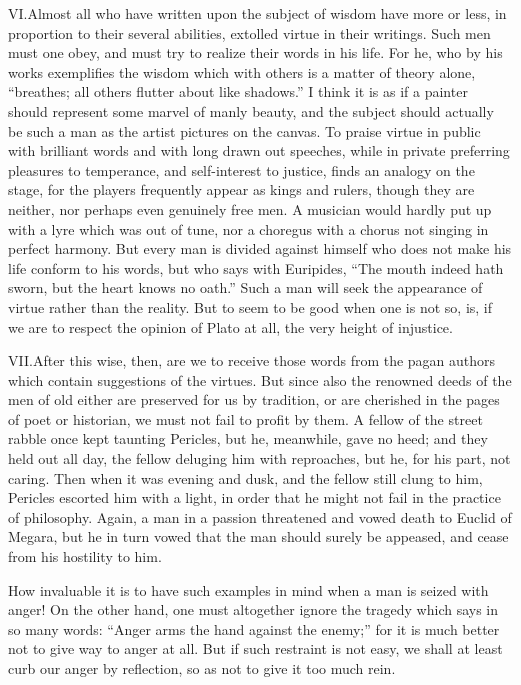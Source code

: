 \documentclass[a4paper]{article}
\begin{document}
\bigskip

\lettrine[lines=3, findent=3pt, nindent=0pt]{VI.} Almost all who have written upon the subject of wisdom have more or less, in proportion to their several abilities, extolled virtue in their writings. Such men must one obey, and must try to realize their words in his life. For he, who by his works exemplifies the wisdom which with others is a matter of theory alone, ``breathes; all others flutter about like shadows.'' I think it is as if a painter should represent some marvel of manly beauty, and the subject should actually be such a man as the artist pictures on the canvas. To praise virtue in public with brilliant words and with long drawn out speeches, while in private preferring pleasures to temperance, and self-interest to justice, finds an analogy on the stage, for the players frequently appear as kings and rulers, though they are neither, nor perhaps even genuinely free men. A musician would hardly put up with a lyre which was out of tune, nor a choregus with a chorus not singing in perfect harmony. But every man is divided against himself who does not make his life conform to his words, but who says with Euripides, ``The mouth indeed hath sworn, but the heart knows no oath.'' Such a man will seek the appearance of virtue rather than the reality. But to seem to be good when one is not so, is, if we are to respect the opinion of Plato at all, the very height of injustice.

\bigskip

\lettrine[lines=3, findent=3pt, nindent=0pt]{VII.} After this wise, then, are we to receive those words from the pagan authors which contain suggestions of the virtues. But since also the renowned deeds of the men of old either are preserved for us by tradition, or are cherished in the pages of poet or historian, we must not fail to profit by them. A fellow of the street rabble once kept taunting Pericles, but he, meanwhile, gave no heed; and they held out all day, the fellow deluging him with reproaches, but he, for his part, not caring. Then when it was evening and dusk, and the fellow still clung to him, Pericles escorted him with a light, in order that he might not fail in the practice of philosophy. Again, a man in a passion threatened and vowed death to Euclid of Megara, but he in turn vowed that the man should surely be appeased, and cease from his hostility to him.

How invaluable it is to have such examples in mind when a man is seized with anger! On the other hand, one must altogether ignore the tragedy which says in so many words: ``Anger arms the hand against the enemy;'' for it is much better not to give way to anger at all. But if such restraint is not easy, we shall at least curb our anger by reflection, so as not to give it too much rein.
\end{document}
